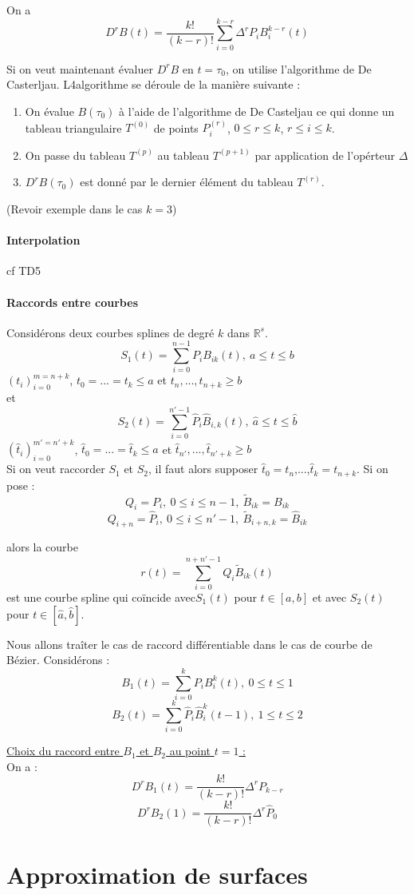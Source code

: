 On a \[D^rB(t)=\frac{k!}{(k-r)!}\sum_{i=0}^{k-r} \Delta^r P_i B_i^{k-r}(t)\]

Si on veut maintenant évaluer $D^rB$ en $t=\tau_0$, on utilise l'algorithme de De Casterljau. L4algorithme se déroule de la manière suivante :
\begin{enumerate}
	\item On évalue $B(\tau_0)$ à l'aide de l'algorithme de De Casteljau ce qui donne un tableau triangulaire $T^{(0)}$ de points $P_i^{(r)}$, $0\leq r\leq k$, $r\leq i\leq k$.
	\item On passe du tableau $T^{(p)}$ au tableau $T^{(p+1)}$ par application de l'opérteur $\Delta$
	\item $D^rB(\tau_0)$ est donné par le dernier élément du tableau $T^{(r)}$.
\end{enumerate}

(Revoir exemple dans le cas $k=3$)

\subsection{Interpolation}
cf TD5

\subsection{Raccords entre courbes}
Considérons deux courbes splines de degré $k$ dans $\mathbb{R}^s$. 
	\[S_1(t)=\sum_{i=0}^{n-1} P_iB_{ik}(t),\ a\leq t\leq b\]
$(t_i)_{i=0}^{m=n+k}$, $t_0=...=t_k\leq a$ et $t_n,...,t_{n+k}\geq b$\\
et \[S_2(t)=\sum_{i=0}^{n'-1}\hat{P}_i\hat{B}_{i,k}(t),\ \hat{a}\leq t\leq \hat{b}\]
$(\hat{t}_i)_{i=0}^{m'=n'+k}$, $\hat{t}_0=...=\hat{t}_k\leq a$ et $\hat{t}_{n'},...,\hat{t}_{n'+k}\geq b$\\

Si on veut raccorder $S_1$ et $S_2$, il faut alors supposer $\hat{t}_0=t_n$,...,$\hat{t}_k=t_{n+k}$. Si on pose :
	\[Q_i=P_i,\ 0\leq i\leq n-1,\ \tilde{B}_{ik}=B_{ik}\]
	\[Q_{i+n}=\hat{P}_i,\ 0\leq i\leq n'-1,\ \tilde{B}_{i+n,k}=\hat{B}_{ik}\]

alors la courbe \[r(t)=\sum_{i=0}^{n+n'-1} Q_i\tilde{B}_{ik}(t)\]
est une courbe spline qui coïncide avec$S_1(t)$ pour $t\in[a,b]$ et avec $S_2(t)$ pour $t\in[\hat{a},\hat{b}]$.

\bigskip
Nous allons traîter le cas de raccord différentiable dans le cas de courbe de Bézier. Considérons :
	\[B_1(t)=\sum_{i=0}^k P_iB_i^k(t),\ 0\leq t\leq 1\]
	\[B_2(t)=\sum_{i=0}^k \hat{P}_i\hat{B}_i^k(t-1),\ 1\leq t\leq 2\]

\underline{Choix du raccord entre $B_1$ et $B_2$ au point $t=1$ :}\\
On a : \[D^rB_1(t)=\frac{k!}{(k-r)!}\Delta^rP_{k-r}\]
	\[D^rB_2(1)=\frac{k!}{(k-r)!}\Delta^r\hat{P}_0\]


\part{Approximation de surfaces}

